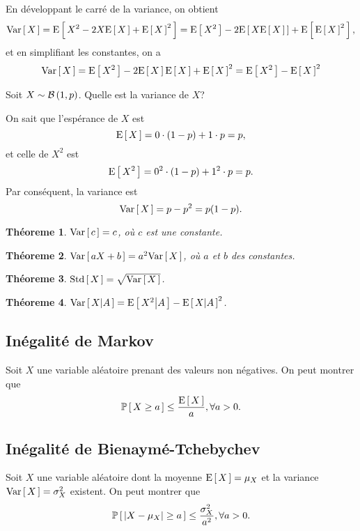 \documentclass[11pt]{article}
\renewcommand\P[1]{%
	\ensuremath{%
		\mathbb{P}\left[\,#1\,\right]%
	}%
}%
\newcommand\Bin[2]{%
	\ensuremath{%
		\mathcal{B}\left(#1,#2\right)%
	}%
}%
\newcommand\Esp[1]{%
	\ensuremath{%
		\mathrm{E}\left[\,#1\,\right]%
	}%
}%
\newcommand\Espg[2]{%
	\ensuremath{%
		\mathrm{E}\left[\,#1\middle\vert#2\,\right]%
	}%
}%
\newcommand\Var[1]{%
	\ensuremath{%
		\mathrm{Var}\left[\,#1\,\right]%
	}%
}%
\newcommand\Varg[2]{%
	\ensuremath{%
		\mathrm{Var}\left[\,#1\middle\vert#2\,\right]%
	}%
}%
\newcommand\Std[1]{%
	\ensuremath{%
		\mathrm{Std}\left[\,#1\,\right]%
	}%
}%
\newtheorem{theoreme}{Théoreme}[section]
\begin{document}
En développant le carré de la variance, on obtient
\begin{equation*}
	\Var{X}
	=\Esp{X^2-2X\Esp{X}+\Esp{X}^2}
	=\Esp{X^2}-2\Esp{X\Esp{X}}+\Esp{\Esp{X}^2},
\end{equation*}
et en simplifiant les constantes, on a
\begin{equation*}
	\Var{X}
	=\Esp{X^2}-2\Esp{X}\Esp{X}+\Esp{X}^2
	=\Esp{X^2}-\Esp{X}^2
\end{equation*}

\begin{exemple}
	Soit $X\sim\Bin{1}{p}$. Quelle est la variance de $X$?

	On sait que l'espérance de $X$ est
	\begin{equation*}
		\Esp{X}=0\cdot(1-p)+1\cdot p=p,
	\end{equation*}
	et celle de $X^2$ est
	\begin{equation*}
		\Esp{X^2}=0^2\cdot(1-p)+1^2\cdot p=p.
	\end{equation*}
	Par conséquent, la variance est
	\begin{equation*}
		\Var{X}=p-p^2=p(1-p).
	\end{equation*}
\end{exemple}

\begin{theoreme}
	$\Var{c}=c$, où $c$ est une constante.
\end{theoreme}

\begin{theoreme}
	$\Var{aX+b}=a^2\Var{X}$, où $a$ et $b$ des constantes.
\end{theoreme}

\begin{theoreme}
	$\Std{X}=\sqrt{\Var{X}}$.
\end{theoreme}

\begin{theoreme}
	$\Varg{X}{A}=\Espg{X^2}{A}-\Espg{X}{A}^2$.
\end{theoreme}

\subsection{Inégalité de Markov}
Soit $X$ une variable aléatoire prenant des valeurs non négatives. On peut
montrer que
\begin{equation*}
	\P{X\geq a}\leq\frac{\Esp{X}}{a},\forall a>0.
\end{equation*}

\subsection{Inégalité de Bienaymé-Tchebychev}
Soit $X$ une variable aléatoire dont la moyenne $\Esp{X}=\mu_X$ et la variance
$\Var{X}=\sigma_X^2$ existent. On peut montrer que
\begin{equation*}
	\P{|X-\mu_X|\geq a}\leq\frac{\sigma_X^2}{a^2},\forall a>0.
\end{equation*}
\end{document}
